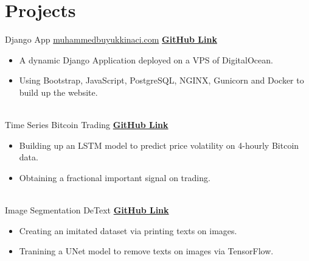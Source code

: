 \documentclass[letterpaper]{DS_class_file} %
\begin{document}
\newpage

\makeseconda %

\section{Projects}

\begin{twenty} %
    
	\twentyitem
	{Django}
	{App}
	{\hspace{0.3cm}\href{https://muhammedbuyukkinaci.com}{muhammedbuyukkinaci.com}}
	{\href{https://github.com/MuhammedBuyukkinaci/muhammedbuyukkinaci.com}{\textbf{GitHub Link}}}
	{}
	{
		{\begin{itemize}
				\item A dynamic Django Application deployed on a VPS of DigitalOcean.
				\item Using Bootstrap, JavaScript, PostgreSQL, NGINX, Gunicorn and Docker to build up the website.
		\end{itemize}}
	}
	\\
	
	\twentyitem
	{Time}
	{Series}
	{\hspace{0.3cm}Bitcoin Trading}
	{\href{https://github.com/MuhammedBuyukkinaci/Bitcoin-Trading}{\textbf{GitHub Link}}}
	{}
	{
		{\begin{itemize}
				\item Building up an LSTM model to predict price volatility on 4-hourly Bitcoin data.
				\item Obtaining a fractional important signal on trading.
		\end{itemize}}
	}
	\\
	
	\twentyitem
	{Image}
	{Segmentation}
	{\hspace{0.3cm}DeText}
	{\href{https://github.com/MuhammedBuyukkinaci/DeText}{\textbf{GitHub Link}}}
	{}
	{
		{\begin{itemize}
				\item Creating an imitated dataset via printing texts on images.
				\item Tranining a UNet model to remove texts on images via TensorFlow.
		\end{itemize}}
	}
	\\
    

\end{twenty}
\end{document}
